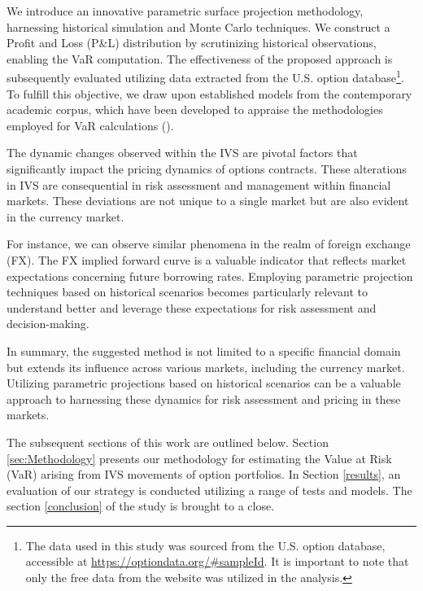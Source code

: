 We introduce an innovative parametric surface projection methodology, harnessing historical simulation and Monte Carlo techniques. We construct a Profit and Loss (P\&L) distribution by scrutinizing historical observations, enabling the VaR computation. The effectiveness of the proposed approach is subsequently evaluated utilizing data extracted from the U.S. option database\footnote{The data used in this study was sourced from the U.S. option database, accessible at \url{https://optiondata.org/\#sampleId}. It is important to note that only the free data from the website was utilized in the analysis.}. To fulfill this objective, we draw upon established models from the contemporary academic corpus, which have been developed to appraise the methodologies employed for VaR calculations (\cite{roccioletti2015backtesting}).

The dynamic changes observed within the IVS are pivotal factors that significantly impact the pricing dynamics of options contracts. These alterations in IVS are consequential in risk assessment and management within financial markets. These deviations are not unique to a single market but are also evident in the currency market. 

For instance, we can observe similar phenomena in the realm of foreign exchange (FX). The FX implied forward curve is a valuable indicator that reflects market expectations concerning future borrowing rates. Employing parametric projection techniques based on historical scenarios becomes particularly relevant to understand better and leverage these expectations for risk assessment and decision-making.

In summary, the suggested method is not limited to a specific financial domain but extends its influence across various markets, including the currency market. Utilizing parametric projections based on historical scenarios can be a valuable approach to harnessing these dynamics for risk assessment and pricing in these markets.

The subsequent sections of this work are outlined below. Section \ref{sec:Methodology} presents our methodology for estimating the Value at Risk (VaR) arising from IVS movements of option portfolios. In Section \ref{results}, an evaluation of our strategy is conducted utilizing a range of tests and models. The section \ref{conclusion} of the study is brought to a close.